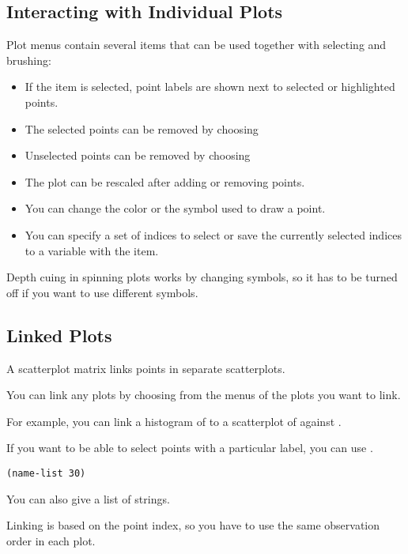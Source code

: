 \begin{slide}{}
\subsection{Interacting with Individual Plots}
Plot menus contain several items that can be used together with
selecting and brushing:
\begin{itemize}
\item
If the  item is selected, point labels are shown
next to selected or highlighted points.
\item
The selected points can be removed by choosing 
\item
Unselected points can be removed by choosing 
\item
The plot can be rescaled after adding or removing points.
\item
You can change the color or the symbol used to draw a point.
\item
You can specify a set of indices to select or save the currently
selected indices to a variable with the  item.
\end{itemize}
Depth cuing in spinning plots works by changing symbols, so it has to
be turned off if you want to use different symbols.
\end{slide}

\begin{slide}{}
\subsection{Linked Plots}
A scatterplot matrix links points in separate scatterplots.

You can link any plots by choosing 
from the menus of the plots you want to link.

For example, you can link a histogram of  to a
scatterplot of  against .

If you want to be able to select points with a particular label, you
can use .
\begin{verbatim}
(name-list 30)
\end{verbatim}
You can also give  a list of strings.

Linking is based on the point index, so you have to use the same
observation order in each plot.
\end{slide}

